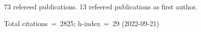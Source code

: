 73 refereed publications. 13 refeered publications as first author.

Total citations~=~2825; h-index~=~29 (2022-09-21)